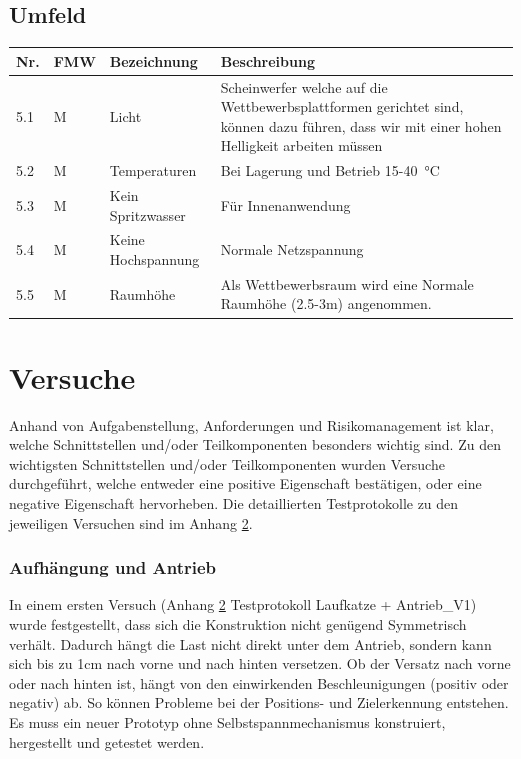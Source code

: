 \documentclass[a4paper]{report}
\begin{document}
\section{Umfeld}
\label{app:sec:Umfeld}
\begin{tabular}{|p{}|p{}|p{}|p{}|}
	\hline
	\textbf{Nr.} & \textbf{FMW\footnotemark} & \textbf{Bezeichnung} & \textbf{Beschreibung} \\
	\hline
	5.1 & M & Licht & Scheinwerfer welche auf die Wettbewerbsplattformen gerichtet sind, können dazu führen, dass wir mit einer hohen Helligkeit arbeiten müssen \\
	\hline
	5.2 & M & Temperaturen & Bei Lagerung und Betrieb 15-\SI{40}{\degreeCelsius}\\
	\hline
	5.3 & M & Kein Spritzwasser & Für Innenanwendung\\
	\hline
	5.4 & M & Keine Hochspannung & Normale Netzspannung\\
	\hline
	5.5 & M & Raumhöhe & Als Wettbewerbsraum wird eine Normale Raumhöhe (2.5-3m) angenommen.\\
	\hline
\end{tabular}

\chapter{Versuche}
\label{app:ch:Versuche}

Anhand von Aufgabenstellung, Anforderungen und Risikomanagement ist klar, welche Schnittstellen und/oder Teilkomponenten besonders wichtig sind. Zu den wichtigsten Schnittstellen und/oder Teilkomponenten wurden Versuche durchgeführt, welche entweder eine positive Eigenschaft bestätigen, oder eine negative Eigenschaft hervorheben. Die detaillierten Testprotokolle zu den jeweiligen Versuchen sind im Anhang \ref{app:ch:Versuche}.

\subsection{Aufhängung und Antrieb}
In einem ersten Versuch (Anhang \ref{app:ch:Versuche} Testprotokoll Laufkatze + Antrieb\_V1) wurde festgestellt, dass sich die Konstruktion nicht genügend Symmetrisch verhält. Dadurch hängt die Last nicht direkt unter dem Antrieb, sondern kann sich bis zu 1cm nach vorne und nach hinten versetzen. Ob der Versatz nach vorne oder nach hinten ist, hängt von den einwirkenden Beschleunigungen (positiv oder negativ) ab. So können Probleme bei der Positions- und Zielerkennung entstehen. Es muss ein neuer Prototyp ohne Selbstspannmechanismus konstruiert, hergestellt und getestet werden.
\end{document}
